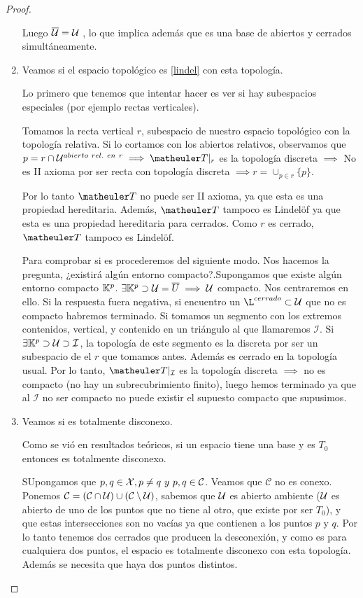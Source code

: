 \begin{proof}
\begin{enumerate}
		Luego  $\overline{\mathcal{U}} = \mathcal{U}$ , lo que implica además que es una base de abiertos y cerrados simultáneamente.
		
		\item Veamos si el espacio topológico es  \ref{lindel} con esta topología.
		
		Lo primero que tenemos que intentar hacer es ver si hay subespacios especiales (por ejemplo rectas verticales).
		
		Tomamos la recta vertical $r$, subespacio de nuestro espacio topológico con la topología relativa. Si lo cortamos con los abiertos relativos, observamos que $p = r \cap \U^{abierto\ rel.\ en\ r} \implies \T|_r$ es la topología discreta $\implies$ No es II axioma por ser recta con topología discreta $\implies r= \cup_{p\in r}\{p\}$.
		
		Por lo tanto $\T$ no puede ser II axioma, ya que esta es una propiedad hereditaria. Además, $\T$ tampoco es Lindelöf ya que esta es una propiedad hereditaria para cerrados. Como $r$ es cerrado, $\T$ tampoco es Lindelöf.
		
		Para comprobar si es  procederemos del siguiente modo. Nos hacemos la pregunta, ¿existirá algún entorno compacto?.Supongamos que existe algún entorno compacto $\mathbb{K}^p$. $\exists \mathbb{K}^p \supset \mathcal{U} = \overline{U} \implies \mathcal{U}$ compacto. Nos centraremos en ello.
		Si la respuesta fuera negativa, si encuentro un $\L^{cerrado} \subset \U$ que no es compacto habremos terminado.
		Si tomamos un segmento con los extremos contenidos, vertical, y contenido en un triángulo al que llamaremos $\mathcal{I}$. Si $\exists \mathbb{K}^p \supset \mathcal{U} \supset \mathcal{I}$, la topología de este segmento es la discreta por ser un subespacio de el $r$ que tomamos antes. Además es cerrado en la topología usual. Por lo tanto, $\T|_\mathcal{I}$ es la topología discreta $\implies$ no es compacto (no hay un subrecubrimiento finito), luego hemos terminado ya que al $\mathcal{I}$ no ser compacto no puede existir el supuesto compacto que supusimos.
		\item Veamos si es totalmente disconexo.
		
		Como se vió en resultados teóricos, si un espacio tiene una base  y es $T_0$ entonces es totalmente disconexo.
		
		SUpongamos que $p,q \in \X, p \neq q\ y\ p,q \in \mathcal{C}$. Veamos que $\mathcal{C}$ no es conexo. Ponemos $\mathcal{C} = (\mathcal{C} \cap \mathcal{U}) \cup (\mathcal{C} \setminus \mathcal{U})$, sabemos que $\mathcal{U}$ es abierto ambiente ($\mathcal{U}$ es abierto de uno de los puntos que no tiene al otro, que existe por ser $T_0$), y que estas intersecciones son no vacías ya que contienen a los puntos $p$ y $q$. Por lo tanto tenemos dos cerrados que producen la desconexión, y como es para cualquiera dos puntos, el espacio es totalmente disconexo con esta topología. Además se necesita que haya dos puntos distintos.
	

\end{enumerate}
\end{proof}

